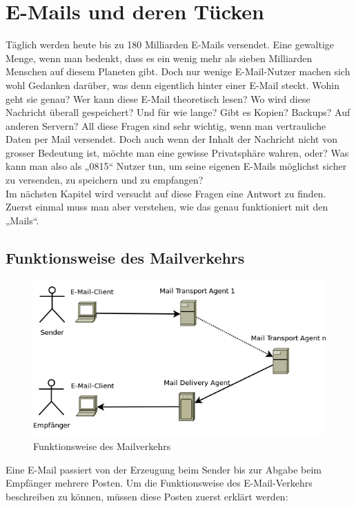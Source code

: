 \section{E-Mails und deren Tücken}
Täglich werden heute bis zu 180 Milliarden E-Mails versendet. Eine gewaltige Menge, wenn man bedenkt, dass es ein wenig mehr als sieben Milliarden Menschen auf diesem Planeten gibt.
Doch nur wenige E-Mail-Nutzer machen sich wohl Gedanken darüber, was denn eigentlich hinter einer E-Mail steckt. Wohin geht sie genau? Wer kann diese E-Mail theoretisch lesen? Wo wird diese Nachricht überall gespeichert? Und für wie lange? Gibt es Kopien? Backups? Auf anderen Servern?
All diese Fragen sind sehr wichtig, wenn man vertrauliche Daten per Mail versendet. Doch auch wenn der Inhalt der Nachricht nicht von grosser Bedeutung ist, möchte man eine gewisse Privatsphäre wahren, oder?
Was kann man also als „0815“ Nutzer tun, um seine eigenen E-Mails möglichst sicher zu versenden, zu speichern und zu empfangen?
\\
Im nächsten Kapitel wird versucht auf diese Fragen eine Antwort zu finden. Zuerst einmal muss man aber verstehen, wie das genau funktioniert mit den „Mails“.

\subsection{Funktionsweise des Mailverkehrs}

\begin{figure}[H]
\centering
\noindent\includegraphics[scale=0.55]{images/email_function}
\caption{Funktionsweise des Mailverkehrs}
\end{figure}

Eine E-Mail passiert von der Erzeugung beim Sender bis zur Abgabe beim Empfänger mehrere Posten. Um die Funktionsweise des E-Mail-Verkehrs beschreiben zu können, müssen diese Posten zuerst erklärt werden:

